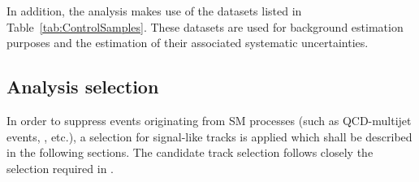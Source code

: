In addition, the analysis makes use of the datasets listed in Table~\ref{tab:ControlSamples}.
These datasets are used for background estimation purposes and the estimation of their associated systematic uncertainties.
\renewcommand{\arraystretch}{1.5}
\begin{table}[!hbt]
\centering
\caption{Further datasets used for background estimation.}
\label{tab:ControlSamples}
\end{table}  
\subsection{Analysis selection}

In order to suppress events originating from SM processes (such as QCD-multijet events, \WJets, etc.), a selection for signal-like tracks is applied which shall be described in the following sections.
The candidate track selection follows closely the selection required in \cite{bib:CMS:DT_8TeV}.\\

